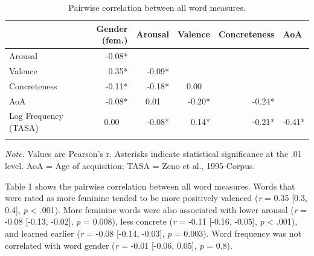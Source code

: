 \documentclass[english,,man,floatsintext]{apa6}
\begin{document}
\begin{table}[tbp]
\begin{center}
\begin{threeparttable}
\caption{\label{tab:unnamed-chunk-14}Pairwise correlation between all word measures.}
\begin{tabular}{lrrrrl}
\toprule
 & Gender (fem.) & Arousal & Valence & Concreteness & AoA\\
\midrule
Arousal & -0.08* &  &  &  & \\
Valence & 0.35* & -0.09* &  &  & \\
Concreteness & -0.11* & -0.18* & 0.00\ \ &  & \\
AoA & -0.08* & 0.01\ \ & -0.20* & -0.24* & \\
Log Frequency (TASA) & 0.00\ \ & -0.08* & 0.14* & -0.21* & -0.41*\\
\bottomrule
\addlinespace
\end{tabular}
\begin{tablenotes}[para]
\normalsize{\textit{Note.} Values are Pearson's r. Asterisks indicate statistical significance at the .01 level. AoA = Age of acquisition; TASA = Zeno et al., 1995 Corpus.}
\end{tablenotes}
\end{threeparttable}
\end{center}
\end{table}

Table 1 shows the pairwise correlation between all word measures. Words that were rated as more feminine tended to be more positively valenced (\emph{r} = 0.35 {[}0.3, 0.4{]}, \emph{p} \textless{} .001). More feminine words were also associated with lower arousal (\emph{r} = -0.08 {[}-0.13, -0.02{]}, \emph{p} = 0.008), less concrete (\emph{r} = -0.11 {[}-0.16, -0.05{]}, \emph{p} \textless{} .001), and learned earlier (\emph{r} = -0.08 {[}-0.14, -0.03{]}, \emph{p} = 0.003). Word frequency was not correlated with word gender (\emph{r} = -0.01 {[}-0.06, 0.05{]}, \emph{p} = 0.8).
\end{document}
